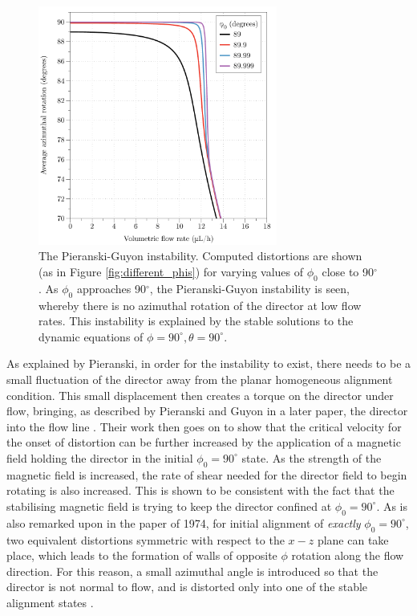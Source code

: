 \begin{figure}
\begin{center}
\includegraphics[width=0.7\textwidth]{Figures/45/pieranski}
\end{center}
\caption[The Pieranski-Guyon instability]{\label{fig:Pieranski_Guyon_instability} The Pieranski-Guyon instability. Computed distortions are shown (as in Figure \ref{fig:different_phis}) for varying values of $\phi_0$ close to 90$^{\circ}$. As $\phi_0$ approaches 90$^{\circ}$, the Pieranski-Guyon instability is seen, whereby there is no azimuthal rotation of the director at low flow rates. This instability is explained by the stable solutions to the dynamic equations of $\phi=90^{\circ},\theta=90^{\circ}$.}
\end{figure}

As explained by Pieranski, in order for the instability to exist, there needs to be a small fluctuation of the director away from the planar homogeneous alignment condition. This small displacement then creates a torque on the director under flow, bringing, as described by Pieranski and Guyon in a later paper, the director into the flow line \cite{Pieranski1974}. Their work then goes on to show that the critical velocity for the onset of distortion can be further increased by the application of a magnetic field holding the director in the initial $\phi_0=90^{\circ}$ state. As the strength of the magnetic field is increased, the rate of shear needed for the director field to begin rotating is also increased. This is shown to be consistent with the fact that the stabilising magnetic field is trying to keep the director confined at $\phi_0=90^{\circ}$. As is also remarked upon in the paper of 1974, for initial alignment of \textit{exactly} $\phi_0=90^{\circ}$, two equivalent distortions symmetric with respect to the $x-z$ plane can take place, which leads to the formation of walls of opposite $\phi$ rotation along the flow direction. For this reason, a small azimuthal angle is introduced so that the director is not normal to flow, and is distorted only into one of the stable alignment states \cite{Pieranski1974}.


